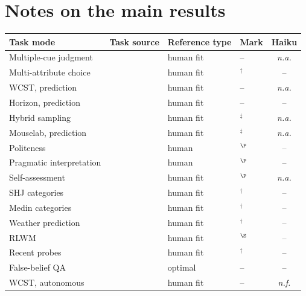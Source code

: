 \documentclass[11pt,a4paper]{article}
\begin{document}
\section{Notes on the main results}
\label{app:tasks}\label{app:construction}\label{app:accepted-controls}
\label{app:table2-controls}
\begin{table}[t]
\centering\footnotesize
\setlength{\tabcolsep}{4pt}
\begin{tabular}{@{}llllc@{}}
\toprule
Task mode & Task source & Reference type & Mark & Haiku \\
\midrule
Multiple-cue judgment & \citealp{collsioo2023numerical} & human fit & -- & \textit{n.a.} \\
Multi-attribute choice & \citealp{hilbig2014generalized} & human fit & $^\dagger$ & -- \\
WCST, prediction & \citealp{grant1948cardsorting,namazova2025centaur} & human fit & -- & \textit{n.a.} \\
Horizon, prediction & \citealp{wilson2014exploration,namazova2025centaur} & human fit & -- & -- \\
Hybrid sampling & \citealp{dambrogio2026information} & human fit & $^\ddagger$ & \textit{n.a.} \\
Mouselab, prediction & \citealp{callaway2022planning} & human fit & $^\ddagger$ & \textit{n.a.} \\
Politeness & \citealp{yoon2016talking} & human & $^\P$ & -- \\
Pragmatic interpretation & \citealp{hu2023fine} & human & $^\P$ & -- \\
Self-assessment & \citealp{jansen2021rational} & human fit & $^\P$ & \textit{n.a.} \\
\addlinespace[2pt]
SHJ categories & \citealp{badham2017category} & human fit & $^\dagger$ & -- \\
Medin categories & \citealp{levering2020revisiting} & human fit & $^\dagger$ & -- \\
Weather prediction & \citealp{speekenbrink2008learning} & human fit & $^\dagger$ & -- \\
RLWM & \citealp{collins2012rlwm} & human fit & $^\S$ & -- \\
Recent probes & \citealp{enkavi2019large} & human fit & $^\dagger$ & -- \\
False-belief QA & \citealp{le2019revisiting} & optimal & -- & -- \\
\addlinespace[2pt]
WCST, autonomous & \citealp{grant1948cardsorting,namazova2025centaur} & human fit & -- & \textit{n.f.} \\

\end{tabular}
\end{table}
\end{document}
